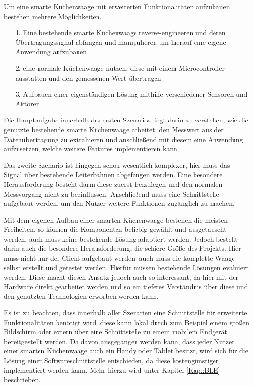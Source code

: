 Um eine smarte Küchenwaage mit erweiterten Funktionalitäten aufzubauen bestehen mehrere Möglichkeiten.
\begin{itemize}
	\item[1.]  Eine bestehende smarte Küchenwaage reverse-engineeren und deren Übertragungssignal abfangen und manipulieren um hierauf eine eigene Anwendung aufzubauen 
	\item[2.] eine normale Küchenwaage nutzen, diese mit einem Microcontroller ausstatten und den gemessenen Wert übertragen 
	\item[3.] Aufbauen einer eigenständigen Lösung mithilfe verschiedener Sensoren und Aktoren
\end{itemize}

Die Hauptaufgabe innerhalb des ersten Szenarios liegt darin zu verstehen, wie die genutzte bestehende smarte Küchenwaage arbeitet, den Messwert aus der Datenübertragung zu extrahieren und anschließend mit diesem eine Anwendung aufzusetzen, welche weitere Features implementieren kann.

Das zweite Szenario ist hingegen schon wesentlich komplexer, hier muss das Signal über bestehende Leiterbahnen abgefangen werden. Eine besondere Herausforderung besteht darin diese zuerst freizulegen und den normalen Messvorgang nicht zu beeinflussen. Anschließend muss eine Schnittstelle aufgebaut werden, um den Nutzer weitere Funktionen zugänglich zu machen. 

Mit dem eigenen Aufbau einer smarten Küchenwaage bestehen die meisten Freiheiten, so können die Komponenten beliebig gewählt und ausgetauscht werden, auch muss keine bestehende Lösung adaptiert werden. Jedoch besteht darin auch die besondere Herausforderung, die schiere Größe des Projekts. Hier muss nicht nur der Client aufgebaut werden, auch muss die komplette Waage selbst erstellt und getestet werden. Hierfür müssen bestehende Lösungen evaluiert werden. Diese macht diesen Ansatz jedoch auch so interessant, da hier mit der Hardware direkt gearbeitet werden und so ein tieferes Verständnis über diese und den genutzten Technologien erworben werden kann. 

Es ist zu beachten, dass innerhalb aller Szenarien eine Schnittstelle für erweiterte Funktionalitäten benötigt wird, diese kann lokal durch zum Beispiel einem großen Bildschirm oder extern über eine Schnittstelle zu einem mobilem Endgerät bereitgestellt werden. Da davon ausgegangen werden kann, dass jeder Nutzer einer smarten Küchenwaage auch ein Handy oder Tablet besitzt, wird sich für die Lösung einer Softwareschnittstelle entschieden, da diese kostengünstiger implementiert werden kann. Mehr hierzu wird unter Kapitel \ref{Kap.:BLE} beschrieben.

